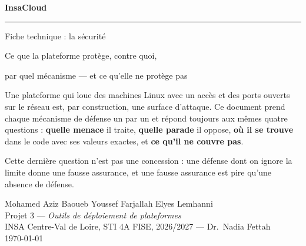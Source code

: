 \documentclass[a4paper,11pt,oneside]{report}
\begin{document}
\begin{titlepage}
\centering
\vspace*{2.2cm}

{\Huge\bfseries InsaCloud\par}
\vspace{6pt}
{\color{insared}\rule{4cm}{2pt}\par}
\vspace{16pt}
{\LARGE Fiche technique : la sécurité\par}
\vspace{10pt}
{\large Ce que la plateforme protège, contre quoi,\par}
{\large par quel mécanisme --- et ce qu'elle ne protège pas\par}

\vspace{2cm}
\begin{minipage}{0.84\textwidth}
\color{gristexte}\small
Une plateforme qui loue des machines Linux avec un accès  et des ports
ouverts sur le réseau est, par construction, une surface d'attaque. Ce document
prend chaque mécanisme de défense un par un et répond toujours aux mêmes quatre
questions : \textbf{quelle menace} il traite, \textbf{quelle parade} il oppose,
\textbf{où il se trouve} dans le code avec ses valeurs exactes, et
\textbf{ce qu'il ne couvre pas}.

\medskip
Cette dernière question n'est pas une concession : une défense dont on ignore
la limite donne une fausse assurance, et une fausse assurance est pire qu'une
absence de défense.
\end{minipage}

\vfill
{\color{gristexte}\small
Mohamed Aziz Baoueb \quad\textbullet\quad Youssef Farjallah
\quad\textbullet\quad Elyes Lemhanni\\[4pt]
Projet 3 --- \textit{Outils de déploiement de plateformes}\\
INSA Centre-Val de Loire, STI 4A FISE, 2026/2027 --- Dr.~Nadia Fettah\\[8pt]
\today\par}
\end{titlepage}

\setcounter{tocdepth}{1}
\tableofcontents
\cleardoublepage
{}











\end{document}
